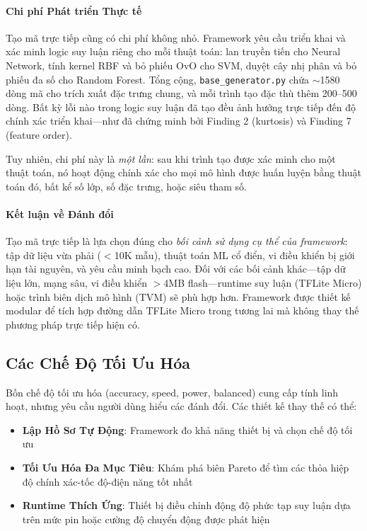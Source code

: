 \paragraph{Chi phí Phát triển Thực tế}
Tạo mã trực tiếp cũng có chi phí không nhỏ. Framework yêu cầu triển khai và xác minh logic suy luận riêng cho mỗi thuật toán: lan truyền tiến cho Neural Network, tính kernel RBF và bỏ phiếu OvO cho SVM, duyệt cây nhị phân và bỏ phiếu đa số cho Random Forest. Tổng cộng, \texttt{base\_generator.py} chứa $\sim$1580 dòng mã cho trích xuất đặc trưng chung, và mỗi trình tạo đặc thù thêm 200--500 dòng. Bất kỳ lỗi nào trong logic suy luận đã tạo đều ảnh hưởng trực tiếp đến độ chính xác triển khai---như đã chứng minh bởi Finding 2 (kurtosis) và Finding 7 (feature order).

Tuy nhiên, chi phí này là \textit{một lần}: sau khi trình tạo được xác minh cho một thuật toán, nó hoạt động chính xác cho mọi mô hình được huấn luyện bằng thuật toán đó, bất kể số lớp, số đặc trưng, hoặc siêu tham số.

\paragraph{Kết luận về Đánh đổi}
Tạo mã trực tiếp là lựa chọn đúng cho \textit{bối cảnh sử dụng cụ thể của framework}: tập dữ liệu vừa phải ($<$10K mẫu), thuật toán ML cổ điển, vi điều khiển bị giới hạn tài nguyên, và yêu cầu minh bạch cao. Đối với các bối cảnh khác---tập dữ liệu lớn, mạng sâu, vi điều khiển $>$4MB flash---runtime suy luận (TFLite Micro) hoặc trình biên dịch mô hình (TVM) sẽ phù hợp hơn. Framework được thiết kế modular để tích hợp đường dẫn TFLite Micro trong tương lai mà không thay thế phương pháp trực tiếp hiện có.

\subsection{Các Chế Độ Tối Ưu Hóa}
Bốn chế độ tối ưu hóa (accuracy, speed, power, balanced) cung cấp tính linh hoạt, nhưng yêu cầu người dùng hiểu các đánh đổi. Các thiết kế thay thế có thể:
\begin{itemize}
    \item \textbf{Lập Hồ Sơ Tự Động}: Framework đo khả năng thiết bị và chọn chế độ tối ưu
    \item \textbf{Tối Ưu Hóa Đa Mục Tiêu}: Khám phá biên Pareto để tìm các thỏa hiệp độ chính xác-tốc độ-điện năng tốt nhất
    \item \textbf{Runtime Thích Ứng}: Thiết bị điều chỉnh động độ phức tạp suy luận dựa trên mức pin hoặc cường độ chuyển động được phát hiện
\end{itemize}

